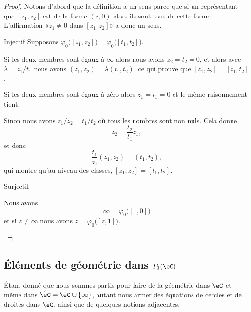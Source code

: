 \begin{proof}
	Notons d'abord que la définition a un sens parce que si un représentant que \( [z_1,z_2]\) est de la forme \( (z,0)\) alors ils sont tous de cette forme. L'affirmation «\( z_1\neq 0\) dans \( [z_1,z_2]\)» a donc un sens.
	\begin{subproof}
		\item[Injectif]
		Supposons \( \varphi_0\big( [z_1,z_2] \big)=\varphi_0\big( [t_1,t_2] \big)\).

		Si les deux membres sont égaux à \( \infty\) alors nous avons \( z_2=t_2=0\), et alors avec \( \lambda=z_1/t_1\) nous avons \( (z_1,z_2)=\lambda (t_1,t_2)\), ce qui prouve que \( [z_1,z_2]=[t_1,t_2]\).

		Si les deux membres sont égaux à zéro alors \( z_1=t_1=0\) et le même raisonnement tient.

		Sinon nous avons \( z_1/z_2=t_1/t_2\) où tous les nombres sont non nuls. Cela donne
		\begin{equation}
			z_2=\frac{ t_2 }{ t_1 }z_1,
		\end{equation}
		et donc
		\begin{equation}
			\frac{ t_1 }{ z_1 }(z_1,z_2)=(t_1,t_2),
		\end{equation}
		qui montre qu'au niveau des classes, \( [z_1,z_2]=[t_1,t_2]\).

		\item[Surjectif]

		Nous avons
		\begin{equation}
			\infty=\varphi_0\big( [1,0] \big)
		\end{equation}
		et si \( z\neq \infty\) nous avons \( z=\varphi_0\big( [z,1] \big)\).
	\end{subproof}
\end{proof}

\subsection{Éléments de géométrie dans \( P_1(\eC)\)}
\label{SUBSECooQPRLooAjMNqp}

Étant donné que nous sommes partis pour faire de la géométrie dans \( \eC\) et même dans \( \hat \eC=\eC\cup \{ \infty \}\), autant nous armer des équations de cercles et de droites dans \( \eC\), ainsi que de quelques notions adjacentes.

